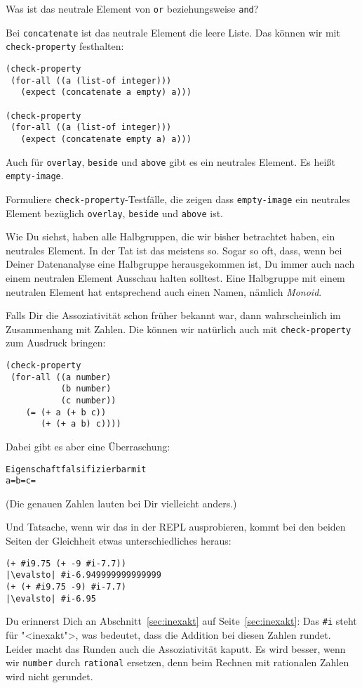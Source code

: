 \begin{aufgabeinline}
  Was ist das neutrale Element von \lstinline{or} beziehungsweise
  \lstinline{and}?
\end{aufgabeinline}
%
Bei \lstinline{concatenate} ist das neutrale Element die leere Liste.
Das können wir mit \lstinline{check-property} festhalten:
%
\begin{lstlisting}
(check-property
 (for-all ((a (list-of integer)))
   (expect (concatenate a empty) a)))

(check-property
 (for-all ((a (list-of integer)))
   (expect (concatenate empty a) a)))
\end{lstlisting}
%
Auch für \lstinline{overlay}, \lstinline{beside} und \lstinline{above}
gibt es ein neutrales Element.  Es heißt
\lstinline{empty-image}.
%
\begin{aufgabeinline}
  Formuliere \lstinline{check-property}-Testfälle, die zeigen dass
  \lstinline{empty-image} ein neutrales Element bezüglich
  \lstinline{overlay}, \lstinline{beside} und \lstinline{above} ist.
\end{aufgabeinline}
%
Wie Du siehst, haben alle Halbgruppen, die wir bisher betrachtet
haben, ein neutrales Element.  In der Tat ist das meistens so.  Sogar
so oft, dass, wenn bei Deiner Datenanalyse eine Halbgruppe
herausgekommen ist, Du immer auch nach einem neutralen Element
Ausschau halten solltest.  Eine Halbgruppe mit einem neutralen Element
hat entsprechend auch einen Namen, nämlich \textit{Monoid}.

Falls Dir die Assoziativität schon früher bekannt war, dann
wahrscheinlich im Zusammenhang mit Zahlen.  Die können wir natürlich
auch mit \lstinline{check-property} zum Ausdruck bringen:
%
\begin{lstlisting}
(check-property
 (for-all ((a number)
           (b number)
           (c number))
    (= (+ a (+ b c))
       (+ (+ a b) c))))
\end{lstlisting}
%
Dabei gibt es aber eine Überraschung:
%
\begin{alltt}
Eigenschaft falsifizierbar mit
  a =  b =  c = 
\end{alltt}
%
(Die genauen Zahlen lauten bei Dir vielleicht anders.)

Und Tatsache, wenn wir das in der REPL ausprobieren, kommt bei den
beiden Seiten der Gleichheit etwas unterschiedliches heraus:
%
\begin{lstlisting}
(+ #i9.75 (+ -9 #i-7.7))
|\evalsto| #i-6.949999999999999
(+ (+ #i9.75 -9) #i-7.7)
|\evalsto| #i-6.95
\end{lstlisting}
%
Du erinnerst Dich an Abschnitt~\ref{sec:inexakt} auf
Seite~\ref{sec:inexakt}: Das \lstinline{#i} steht für "<inexakt">, was
bedeutet, dass die Addition bei diesen Zahlen rundet.  Leider macht
das Runden auch die Assoziativität kaputt.  Es wird besser, wenn wir
\lstinline{number} durch \lstinline{rational} ersetzen, denn beim
Rechnen mit rationalen Zahlen wird nicht gerundet.

